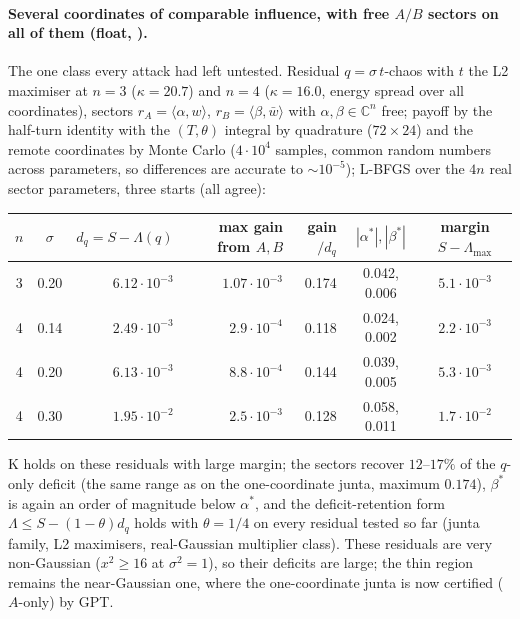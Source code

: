 \documentclass[11pt,a4paper]{article}
\newcommand{\C}{\mathbb{C}}\newcommand{\R}{\mathbb{R}}\newcommand{\E}{\mathbb{E}}\newcommand{\Hc}[2]{H_{#1,#2}}
\begin{document}
\paragraph{Several coordinates of comparable influence, with free $A/B$ sectors on all of them (float, ).} The one class every attack had left
untested. Residual $q=\sigma\,t$-chaos with $t$ the L2 maximiser at $n=3$ ($\kappa=20.7$) and $n=4$ ($\kappa=16.0$, energy spread over all coordinates), sectors
$r_A=\langle\alpha,w\rangle$, $r_B=\langle\beta,\bar w\rangle$ with $\alpha,\beta\in\C^n$ free; payoff by the half-turn identity with the $(T,\theta)$ integral by quadrature ($72\times24$)
and the remote coordinates by Monte Carlo ($4\cdot10^4$ samples, common random numbers across parameters, so differences are accurate to $\sim10^{-5}$); L-BFGS over the $4n$ real
sector parameters, three starts (all agree):
\begin{center}\small\begin{tabular}{ccrrrcc}\toprule
$n$ & $\sigma$ & $d_q=S-\Lambda(q)$ & max gain from $A,B$ & gain$/d_q$ & $|\alpha^*|,|\beta^*|$ & margin $S-\Lambda_{\max}$\\\midrule
3 & 0.20 & $6.12\cdot10^{-3}$ & $1.07\cdot10^{-3}$ & 0.174 & 0.042, 0.006 & $5.1\cdot10^{-3}$\\
4 & 0.14 & $2.49\cdot10^{-3}$ & $2.9\cdot10^{-4}$ & 0.118 & 0.024, 0.002 & $2.2\cdot10^{-3}$\\
4 & 0.20 & $6.13\cdot10^{-3}$ & $8.8\cdot10^{-4}$ & 0.144 & 0.039, 0.005 & $5.3\cdot10^{-3}$\\
4 & 0.30 & $1.95\cdot10^{-2}$ & $2.5\cdot10^{-3}$ & 0.128 & 0.058, 0.011 & $1.7\cdot10^{-2}$\\\bottomrule\end{tabular}\end{center}
K holds on these residuals with large margin; the sectors recover $12$--$17\%$ of the $q$-only deficit (the same range as on the one-coordinate junta, maximum $0.174$),
$\beta^*$ is again an order of magnitude below $\alpha^*$, and the deficit-retention form $\Lambda\le S-(1-\theta)d_q$ holds with $\theta=1/4$ on every residual tested so far
(junta family, L2 maximisers, real-Gaussian multiplier class). These residuals are very non-Gaussian ($x^2\ge16$ at $\sigma^2=1$), so their deficits are large; the thin region
remains the near-Gaussian one, where the one-coordinate junta is now certified ($A$-only) by GPT.
\end{document}
